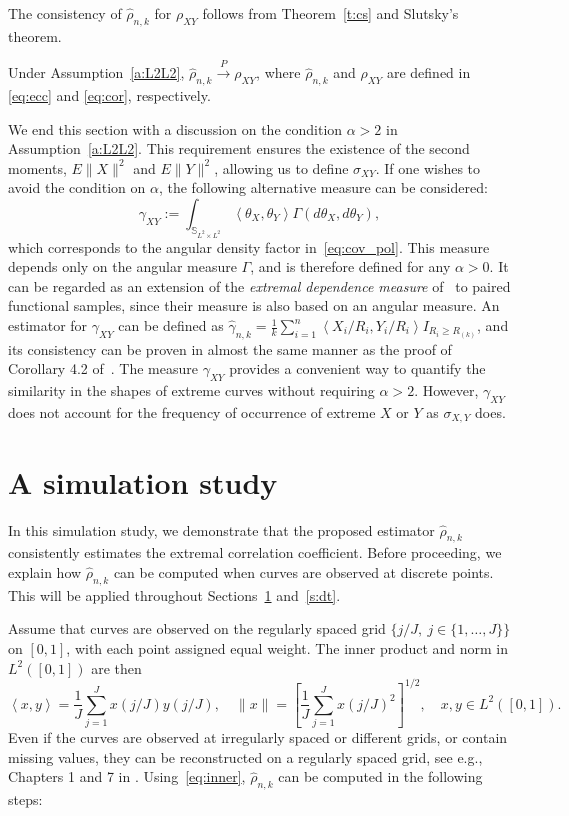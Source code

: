 \documentclass[lineno]{biometrika}
\newcommand \ag{\alpha}
\newcommand \ga{\gamma}
\newcommand \Gg{\Gamma}
\newcommand \sg{\sigma}
\newcommand{\thg}{\theta}%
\newcommand\mbS{{\mathbb S}}
\newcommand\lb{\left [}
\newcommand\rb{\right ]}
\newcommand\lip{\left \langle}
\newcommand\rip{\right \rangle}
\def\convP{\stackrel{\mbox{$\scriptstyle P$}}{\rightarrow}}
\begin{document}
The consistency of $\hat{\rho}_{n,k}$ for $\rho_{XY}$ follows from  Theorem~\ref{t:cs} and Slutsky's theorem.

\begin{corollary}\label{c:cs}
Under Assumption~\ref{a:L2L2},
$\hat{\rho}_{n,k} \convP \rho_{XY}$,
where $\hat{\rho}_{n,k}$ and $\rho_{XY}$  are defined in \eqref{eq:ecc} and
\eqref{eq:cor}, respectively.
\end{corollary}





We end this section with a discussion on the condition $\ag>2$ in Assumption~\ref{a:L2L2}. This requirement ensures the existence of the second moments, $E \|X\|^2$ and $E \|Y\|^2$, allowing us to define $\sg_{XY}$. If one wishes to avoid the condition on $\ag$, the following alternative measure can be considered:
\[
\ga_{XY} := \int_{\mbS_{L^2 \times L^2}} \lip \thg_X, \thg_Y \rip \Gg(d\thg_X, d\thg_Y),
\]
which corresponds to the angular density factor in~\eqref{eq:cov_pol}.
This measure depends only on the angular measure $\Gg$,
and is therefore defined for any $\ag>0$. It can be regarded as
an extension of the {\it extremal dependence measure}
of~\citet{larsson:resnick:2012} to paired functional samples,
since their measure is also based on an angular measure.
An estimator for $\ga_{XY}$ can be defined as
$\hat{\ga}_{n,k} = \frac{1}{k} \sum_{i=1}^n
\lip X_i/R_i, Y_i/R_i \rip I_{R_i \ge R_{(k)}}$,
and its consistency can be proven in almost the same manner
as  the proof of Corollary 4.2 of~\citet{clemenccon:huet:sabourin:2023}.
The measure $\gamma_{XY}$ provides a convenient way
to quantify the similarity in the shapes of extreme curves without requiring $\ag>2$.
However, $\gamma_{XY}$ does not account for the frequency of occurrence
of extreme $X$ or $ Y$ as $\sg_{X, Y}$ does.


\section{A simulation study} \label{s:pw}
In this simulation study, we demonstrate that the proposed estimator
$\hat{\rho}_{n,k}$ consistently estimates the extremal correlation coefficient.
Before proceeding, we explain how $\hat{\rho}_{n,k}$ can be computed when curves are observed at discrete points. This will be applied throughout Sections~\ref{s:pw} and~\ref{s:dt}.

Assume that curves are observed on the regularly spaced grid $\{j/J, \ j \in \{1, \ldots, J\} \}$ on $[0,1]$, with each point assigned equal weight. The inner product and norm in $L^2([0,1])$ are then
\begin{equation} \label{eq:inner}
\lip x,y\rip = \frac{1}{J} \sum_{j=1}^Jx(j/J)y(j/J), \quad \|x\| = \lb \frac{1}{J} \sum_{j=1}^Jx(j/J)^2 \rb^{1/2}, \quad x,y \in L^2([0,1]).
\end{equation}
Even if the curves are observed at irregularly spaced or different  grids, or contain missing values, they can be  reconstructed on a regularly spaced grid, see e.g., Chapters 1 and 7 in \citet{KRbook}.
Using~\eqref{eq:inner}, $\hat{\rho}_{n,k}$ can be computed in  the following steps:
\end{document}

